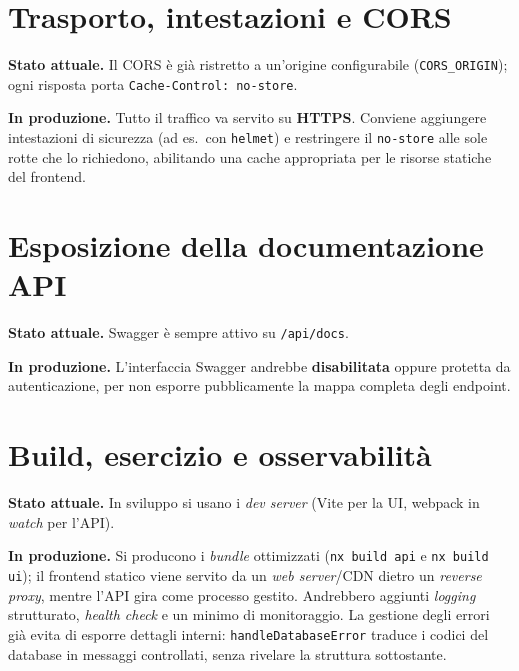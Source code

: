 \documentclass[11pt,a4paper,oneside]{report}
\newcommand{\code}[1]{\texttt{\small #1}}
\begin{document}
\section{Trasporto, intestazioni e CORS}
\textbf{Stato attuale.} Il CORS è già ristretto a un'origine configurabile
(\code{CORS\_ORIGIN}); ogni risposta porta \code{Cache-Control: no-store}.

\textbf{In produzione.} Tutto il traffico va servito su \textbf{HTTPS}. Conviene
aggiungere intestazioni di sicurezza (ad es.\ con \code{helmet}) e restringere il
\code{no-store} alle sole rotte che lo richiedono, abilitando una cache
appropriata per le risorse statiche del frontend.

\section{Esposizione della documentazione API}
\textbf{Stato attuale.} Swagger è sempre attivo su \code{/api/docs}.

\textbf{In produzione.} L'interfaccia Swagger andrebbe \textbf{disabilitata} oppure
protetta da autenticazione, per non esporre pubblicamente la mappa completa
degli endpoint.

\section{Build, esercizio e osservabilità}
\textbf{Stato attuale.} In sviluppo si usano i \emph{dev server} (Vite per la UI,
webpack in \emph{watch} per l'API).

\textbf{In produzione.} Si producono i \emph{bundle} ottimizzati (\code{nx build
api} e \code{nx build ui}); il frontend statico viene servito da un \emph{web
server}/CDN dietro un \emph{reverse proxy}, mentre l'API gira come processo
gestito. Andrebbero aggiunti \emph{logging} strutturato, \emph{health check} e un
minimo di monitoraggio. La gestione degli errori già evita di esporre dettagli
interni: \code{handleDatabaseError} traduce i codici del database in messaggi
controllati, senza rivelare la struttura sottostante.
\end{document}
